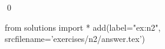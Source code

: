 \begin{ex}
  \label{ex:n2}
  
  \qed
\end{ex}
\begin{python0}
from solutions import *
add(label="ex:n2",
    srcfilename='exercises/n2/answer.tex') 
\end{python0}                              
